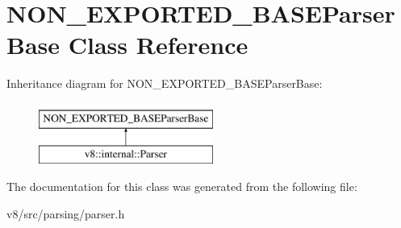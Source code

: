 \hypertarget{classNON__EXPORTED__BASEParserBase}{}\section{N\+O\+N\+\_\+\+E\+X\+P\+O\+R\+T\+E\+D\+\_\+\+B\+A\+S\+E\+Parser\+Base Class Reference}
\label{classNON__EXPORTED__BASEParserBase}
Inheritance diagram for N\+O\+N\+\_\+\+E\+X\+P\+O\+R\+T\+E\+D\+\_\+\+B\+A\+S\+E\+Parser\+Base\+:\begin{figure}[H]
\begin{center}
\leavevmode
\includegraphics[height=2.000000cm]{classNON__EXPORTED__BASEParserBase}
\end{center}
\end{figure}


The documentation for this class was generated from the following file\+:\begin{DoxyCompactItemize}
\item 
v8/src/parsing/parser.\+h\end{DoxyCompactItemize}
